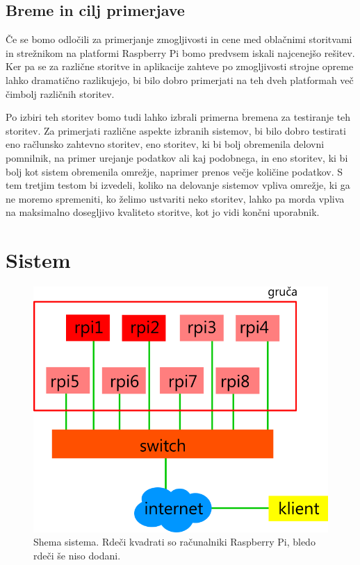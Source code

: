 \documentclass[11pt]{article}
\begin{document}
\subsection{Breme in cilj primerjave}
Če se bomo odločili za primerjanje zmogljivosti in cene med oblačnimi storitvami in strežnikom na platformi Raspberry Pi bomo predvsem iskali najcenejšo rešitev. Ker pa se za različne storitve in aplikacije zahteve po zmogljivosti strojne opreme lahko dramatično razlikujejo, bi bilo dobro primerjati na teh dveh platformah več čimbolj različnih storitev. 

Po izbiri teh storitev bomo tudi lahko izbrali primerna bremena za testiranje teh storitev. Za primerjati različne aspekte izbranih sistemov, bi bilo dobro testirati eno račlunsko zahtevno storitev, eno storitev, ki bi bolj obremenila delovni pomnilnik, na primer urejanje podatkov ali kaj podobnega, in eno storitev, ki bi bolj kot sistem obremenila omrežje, naprimer prenos večje količine podatkov. S tem tretjim testom bi izvedeli, koliko na delovanje sistemov vpliva omrežje, ki ga ne moremo spremeniti, ko želimo ustvariti neko storitev, lahko pa morda vpliva na maksimalno dosegljivo kvaliteto storitve, kot jo vidi končni uporabnik.

\newpage
\section{Sistem}
\begin{figure}[H]
\centerline{\includegraphics[scale=1.5]
{shemaSistema.png}}
\caption{Shema sistema. Rdeči kvadrati so računalniki Raspberry Pi, bledo rdeči še niso dodani.}
\label{fig:gruca}
\end{figure}
\end{document}
